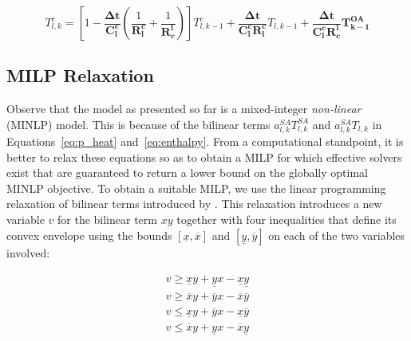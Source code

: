\begin{equation}\label{eq:tlc}
T^{c}_{l,k} = 
\left[ 1 - \frac{\bm{\Delta t}}{\bm{C_l^c}} (\frac{1}{\bm{R^c_l}} +  \frac{1}{\bm{R^l_c}} )  \right] T^{c}_{l,k-1} + 
\frac{\bm{\Delta t}}{{\bm{C_l^c}}{\bm{R^c_l}}} T_{l,k-1} + 
\frac{\bm{\Delta t}}{{\bm{C_l^c}}{\bm{R^l_c}}} \bm{T^{OA}_{k-1}} 
\end{equation}



\subsection{MILP Relaxation}
\label{subsec:relaxation}
Observe that the model as presented so far is a mixed-integer {\em non-linear} (MINLP) model. This is because of the bilinear terms $a_{l,k}^{SA}T_{l,k}^{SA}$ and $a_{l,k}^{SA}T_{l,k}$ in Equations~\eqref{eq:p_heat} and~\eqref{eq:enthalpy}. From a computational standpoint, it is better to relax these equations so as to obtain a MILP for which effective solvers exist that are guaranteed to return a lower bound on the globally optimal MINLP objective.  To obtain a suitable MILP, we use the linear programming relaxation of bilinear terms introduced by \cite{mccormick1976computability}. This relaxation introduces a new variable $v$ for the bilinear term $xy$ together with four
inequalities that define its convex envelope using the bounds $[\underline{x},\overline{x}]$ and $[\underline{y},\overline{y}]$ on each of the two variables involved:

\[\begin{array}{l}
v \geq \underline{x}y + \underline{y}x - \underline{x}\underline{y}\\
v \geq \overline{x}y + \overline{y}x - \overline{x}\overline{y}\\
v \leq \underline{x}y + \overline{y}x - \underline{x}\overline{y}\\
v \leq \overline{x}y + \underline{y}x - \overline{x}\underline{y}
\end{array}
\]

